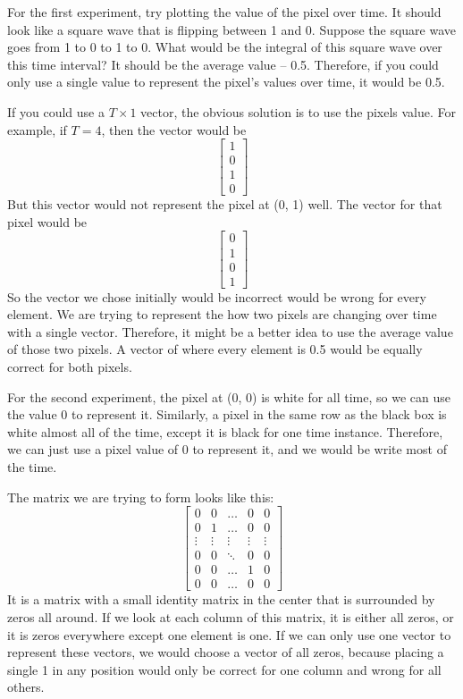 For the first experiment, try plotting the value of the pixel over time. It should look like a square wave that is flipping between 1 and 0. Suppose the square wave goes from 1 to 0 to 1 to 0. What would be the integral of this square wave over this time interval? It should be the average value -- 0.5. Therefore, if you could only use a single value to represent the pixel's values over time, it would be 0.5.

If you could use a $T \times 1$ vector, the obvious solution is to use the pixels value. For example, if $T = 4$, then the vector would be
$$\left[\begin{matrix}
	1 \\
	0 \\
	1 \\
	0
\end{matrix}\right]$$
But this vector would not represent the pixel at (0, 1) well. The vector for that pixel would be
$$\left[\begin{matrix}
	0 \\
	1 \\
	0 \\
	1
\end{matrix}\right]$$
So the vector we chose initially would be incorrect would be wrong for every element. We are trying to represent the how two pixels are changing over time with a single vector. Therefore, it might be a better idea to use the average value of those two pixels. A vector of where every element is 0.5 would be equally correct for both pixels.

For the second experiment, the pixel at (0, 0) is white for all time, so we can use the value 0 to represent it. Similarly, a pixel in the same row as the black box is white almost all of the time, except it is black for one time instance. Therefore, we can just use a pixel value of 0 to represent it, and we would be write most of the time.

The matrix we are trying to form looks like this:
$$\left[\begin{matrix}
	0 & 0 & \ldots & 0 & 0 \\
	0 & 1 & \ldots & 0 & 0 \\
	\vdots & \vdots & \vdots & \vdots & \vdots \\
	0 & 0 & \ddots & 0 & 0 \\
	0 & 0 & \ldots & 1 & 0 \\
	0 & 0 & \ldots & 0 & 0
\end{matrix}\right]$$
It is a matrix with a small identity matrix in the center that is surrounded by zeros all around. If we look at each column of this matrix, it is either all zeros, or it is zeros everywhere except one element is one. If we can only use one vector to represent these vectors, we would choose a vector of all zeros, because placing a single 1 in any position would only be correct for one column and wrong for all others.

